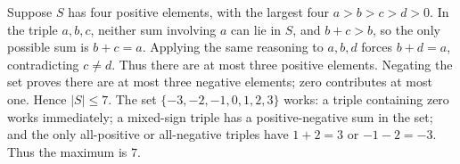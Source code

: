 Suppose $S$ has four positive elements, with the largest four $a>b>c>d>0$. In the triple $a,b,c$, neither sum involving $a$ can lie in $S$, and $b+c>b$, so the only possible sum is $b+c=a$. Applying the same reasoning to $a,b,d$ forces $b+d=a$, contradicting $c\ne d$. Thus there are at most three positive elements. Negating the set proves there are at most three negative elements; zero contributes at most one. Hence $|S|\le7$. The set $\{-3,-2,-1,0,1,2,3\}$ works: a triple containing zero works immediately; a mixed-sign triple has a positive-negative sum in the set; and the only all-positive or all-negative triples have $1+2=3$ or $-1-2=-3$. Thus the maximum is $\boxed7$.

